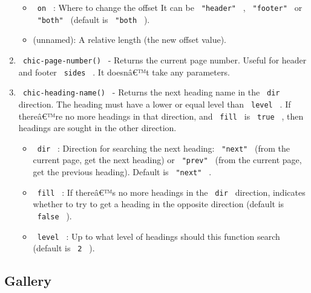 \begin{enumerate}
  \begin{itemize}
  \tightlist
  \item
    \texttt{\ on\ } : Where to change the offset It can be
    \texttt{\ "header"\ } , \texttt{\ "footer"\ } or \texttt{\ "both"\ }
    (default is \texttt{\ "both\ } ).
  \item
    (unnamed): A relative length (the new offset value).
  \end{itemize}
\item
  \texttt{\ chic-page-number()\ } - Returns the current page number.
  Useful for header and footer \texttt{\ sides\ } . It doesnâ€™t take
  any parameters.
\item
  \texttt{\ chic-heading-name()\ } - Returns the next heading name in
  the \texttt{\ dir\ } direction. The heading must have a lower or equal
  level than \texttt{\ level\ } . If thereâ€™re no more headings in that
  direction, and \texttt{\ fill\ } is \texttt{\ true\ } , then headings
  are sought in the other direction.

  \begin{itemize}
  \tightlist
  \item
    \texttt{\ dir\ } : Direction for searching the next heading:
    \texttt{\ "next"\ } (from the current page, get the next heading) or
    \texttt{\ "prev"\ } (from the current page, get the previous
    heading). Default is \texttt{\ "next"\ } .
  \item
    \texttt{\ fill\ } : If thereâ€™s no more headings in the
    \texttt{\ dir\ } direction, indicates whether to try to get a
    heading in the opposite direction (default is \texttt{\ false\ } ).
  \item
    \texttt{\ level\ } : Up to what level of headings should this
    function search (default is \texttt{\ 2\ } ).
  \end{itemize}
\end{enumerate}

\subsection{Gallery}\label{gallery}

\subsubsection{\texorpdfstring{\protect{}}{Example 1}}\label{example-1}

